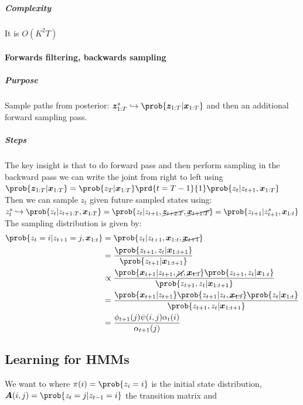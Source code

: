\subparagraph{Complexity}
It is $O(K^{2}T)$

\paragraph{Forwards filtering, backwards sampling}
\subparagraph{Purpose}
Sample paths from posterior: $\bm{z}^{s}_{1:T} \hookrightarrow \prob{\bm{z}_{1:T}|\bm{x}_{1:T}}$
 and then an additional 
forward sampling pass.
\subparagraph{Steps}
The key insight is that to do forward pass and then perform sampling in the backward pass we can
write the joint from right to left using
$\prob{\bm{z}_{1:T}|\bm{x}_{1:T}} = \prob{z_{T}|\bm{x}_{1:T}
}\prd{t=T-1}{1}\prob{z_{t}|z_{t+1},\bm{x}_{1:T}}$\\
Then we can sample $z_{t}$ given future sampled states using:\\
$z^{s}_{t} \hookrightarrow\prob{z_{t}|z_{t+1:T},\bm{x}_{1:T}} = \prob{z_{t}|z_{t+1},\cancel{\bm{z}_{
t+2:T}}, \cancel{\bm{x}_{t+1:T}}} =  \prob{z_{t+1}|z_{t+1}^{s},\bm{x}_{1:t}}$\\

The sampling distribution is given by:
\begin{align*}
    \prob{z_{t}=i|z_{t+1}=j,\bm{x}_{1:t}}
    &= \prob{z_{t}|z_{t+1},\bm{x}_{1:t},\cancel{\bm{x}_{t+1}}}\\
    &= \dfrac{\prob{z_{t+1},z_{t}|\bm{x}_{1:t+1}}}{\prob{z_{t+1}|\bm{x}_{1:t+1}}}\\
    &\propto \dfrac{\prob{\bm{x}_{t+1}|z_{t+1},\cancel{z_{t}},\cancel{\bm{x}_{1:t}}}\prob{z_{t+1},
            z_{t}|\bm{x}_{1:t}}}{\prob{z_{t+1},z_{t}|\bm{x}_{1:t+1}}}\\
    &= \dfrac{\prob{\bm{x}_{t+1}|z_{t+1}}\prob{z_{t+1}|z_{t},\cancel{\bm{x}_{1:t}}}\prob{z_{t}|
    \bm{x}_{1:t}}}{\prob{z_{t+1},z_{t}|\bm{x}_{1:t+1}}}\\
    &= \dfrac{\phi_{t+1}(j)\psi(i,j)\alpha_{t}(i)}{\alpha_{t+1}(j)}
\end{align*}

\subsection{Learning for HMMs}
We want to  where $\pi(i)=\prob{
z_{i}=i}$ is the initial state distribution, $\bm{A}(i,j)=\prob{z_{t}=j|z_{t-1}=i}$ the transition
matrix and 
